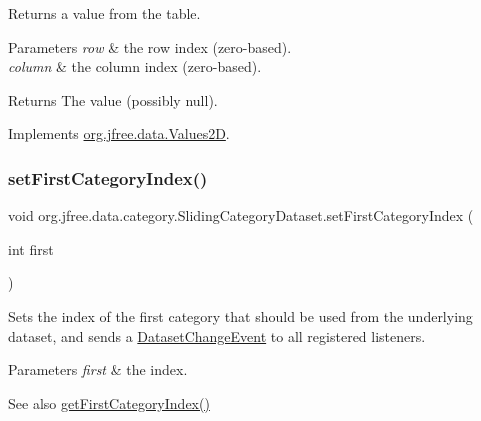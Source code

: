 Returns a value from the table.


\begin{DoxyParams}{Parameters}
{\em row} & the row index (zero-\/based). \\
\hline
{\em column} & the column index (zero-\/based).\\
\hline
\end{DoxyParams}
\begin{DoxyReturn}{Returns}
The value (possibly {\ttfamily null}). 
\end{DoxyReturn}


Implements \mbox{\hyperlink{interfaceorg_1_1jfree_1_1data_1_1_values2_d_a0797937d3ac62e18b300eef1fe906ec6}{org.\+jfree.\+data.\+Values2D}}.

\mbox{\label{classorg_1_1jfree_1_1data_1_1category_1_1_sliding_category_dataset_a757306381117f304d57cda56a23c9560}} 
\subsubsection{\texorpdfstring{set\+First\+Category\+Index()}{setFirstCategoryIndex()}}
{\footnotesize\ttfamily void org.\+jfree.\+data.\+category.\+Sliding\+Category\+Dataset.\+set\+First\+Category\+Index (\begin{DoxyParamCaption}\item[{int}]{first }\end{DoxyParamCaption})}

Sets the index of the first category that should be used from the underlying dataset, and sends a \mbox{\hyperlink{}{Dataset\+Change\+Event}} to all registered listeners.


\begin{DoxyParams}{Parameters}
{\em first} & the index.\\
\hline
\end{DoxyParams}
\begin{DoxySeeAlso}{See also}
\mbox{\hyperlink{classorg_1_1jfree_1_1data_1_1category_1_1_sliding_category_dataset_a49c20f92d2e200495654034cd794f2d9}{get\+First\+Category\+Index()}} 
\end{DoxySeeAlso}
\mbox{\label{classorg_1_1jfree_1_1data_1_1category_1_1_sliding_category_dataset_a10e63844beab0737535bfde779f1cbff}} 
